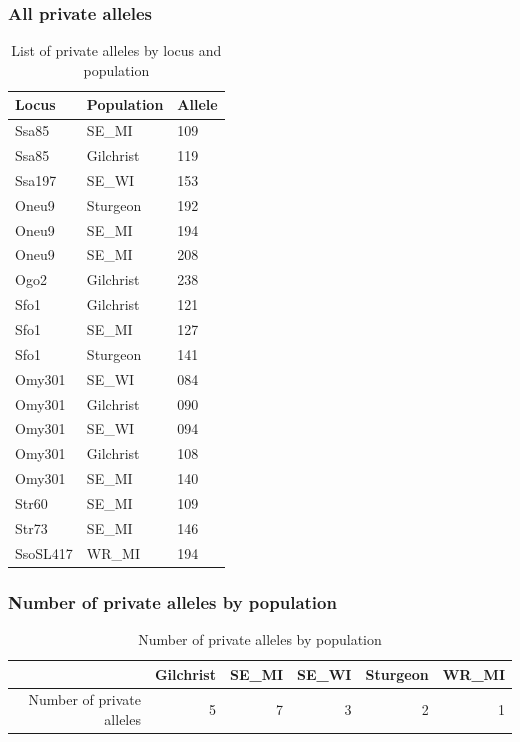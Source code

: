 \documentclass[a4paper]{scrartcl}\usepackage[]{graphicx}\usepackage[]{color}
\begin{document}
\subsubsection{All private alleles}
\begin{table}[ht]
\centering
\begin{tabular}{lll}
  \hline
Locus & Population & Allele \\ 
  \hline
Ssa85 & SE\_MI & 109 \\ 
  Ssa85 & Gilchrist & 119 \\ 
  Ssa197 & SE\_WI & 153 \\ 
  Oneu9 & Sturgeon & 192 \\ 
  Oneu9 & SE\_MI & 194 \\ 
  Oneu9 & SE\_MI & 208 \\ 
  Ogo2 & Gilchrist & 238 \\ 
  Sfo1 & Gilchrist & 121 \\ 
  Sfo1 & SE\_MI & 127 \\ 
  Sfo1 & Sturgeon & 141 \\ 
  Omy301 & SE\_WI & 084 \\ 
  Omy301 & Gilchrist & 090 \\ 
  Omy301 & SE\_WI & 094 \\ 
  Omy301 & Gilchrist & 108 \\ 
  Omy301 & SE\_MI & 140 \\ 
  Str60 & SE\_MI & 109 \\ 
  Str73 & SE\_MI & 146 \\ 
  SsoSL417 & WR\_MI & 194 \\ 
   \hline
\end{tabular}
\caption{List of private alleles by locus and population} 
\end{table}

\FloatBarrier
\subsubsection{Number of private alleles by population}
\begin{table}[ht]
\centering
\begin{tabular}{rrrrrr}
  \hline
 & Gilchrist & SE\_MI & SE\_WI & Sturgeon & WR\_MI \\ 
  \hline
Number of private alleles &   5 &   7 &   3 &   2 &   1 \\ 
   \hline
\end{tabular}
\caption{Number of private alleles by population} 
\end{table}
\end{document}

